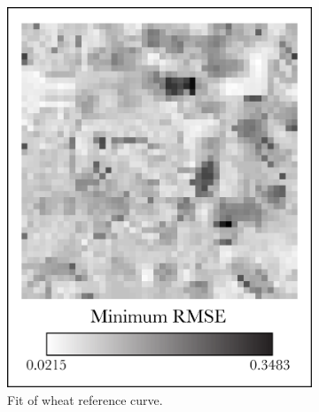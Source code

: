 \begin{figure}
\begin{subfigure}[b]{.45\textwidth}
    \includegraphics[width=\textwidth]{Graphics/wheat1_edited.png}
    \caption{Fit of wheat reference curve.}
    \label{subfig:wheat1}
  \end{subfigure}
  \quad
  \begin{subfigure}[b]{.45\textwidth}

\end{subfigure}
\end{figure}
